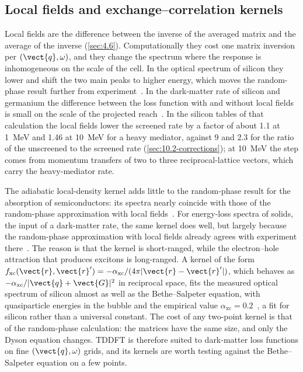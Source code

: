 \subsection{Local fields and exchange--correlation kernels}

Local fields are the difference between the inverse of the averaged matrix and the average of the inverse (\cref{sec:4.6}). Computationally they cost one matrix inversion per $(\vect{q},\omega)$, and they change the spectrum where the response is inhomogeneous on the scale of the cell. In the optical spectrum of silicon they lower and shift the two main peaks to higher energy, which moves the random-phase result further from experiment~\cite{albrecht1998ab}. In the dark-matter rate of silicon and germanium the difference between the loss function with and without local fields is small on the scale of the projected reach~\cite{knapen2021dark}. In the silicon tables of that calculation the local fields lower the screened rate by a factor of about 1.1 at \SI{1}{MeV} and 1.46 at \SI{10}{MeV} for a heavy mediator, against 9 and 2.3 for the ratio of the unscreened to the screened rate (\cref{sec:10.2-corrections}); at \SI{10}{MeV} the step comes from momentum transfers of two to three reciprocal-lattice vectors, which carry the heavy-mediator rate.

The adiabatic local-density kernel adds little to the random-phase result for the absorption of semiconductors: its spectra nearly coincide with those of the random-phase approximation with local fields~\cite{reining2002excitonic}. For energy-loss spectra of solids, the input of a dark-matter rate, the same kernel does well, but largely because the random-phase approximation with local fields already agrees with experiment there~\cite{reining2002excitonic}. The reason is that the kernel is short-ranged, while the electron--hole attraction that produces excitons is long-ranged. A kernel of the form $f_{\mathrm{xc}}(\vect{r},\vect{r}') = -\alpha_{\mathrm{xc}}/(4\pi|\vect{r} - \vect{r}'|)$, which behaves as $-\alpha_{\mathrm{xc}}/|\vect{q}+\vect{G}|^2$ in reciprocal space, fits the measured optical spectrum of silicon almost as well as the Bethe--Salpeter equation, with quasiparticle energies in the bubble and the empirical value $\alpha_{\mathrm{xc}} = 0.2$~\cite{reining2002excitonic}, a fit for silicon rather than a universal constant. The cost of any two-point kernel is that of the random-phase calculation: the matrices have the same size, and only the Dyson equation changes. TDDFT is therefore suited to dark-matter loss functions on fine $(\vect{q},\omega)$ grids, and its kernels are worth testing against the Bethe--Salpeter equation on a few points.

